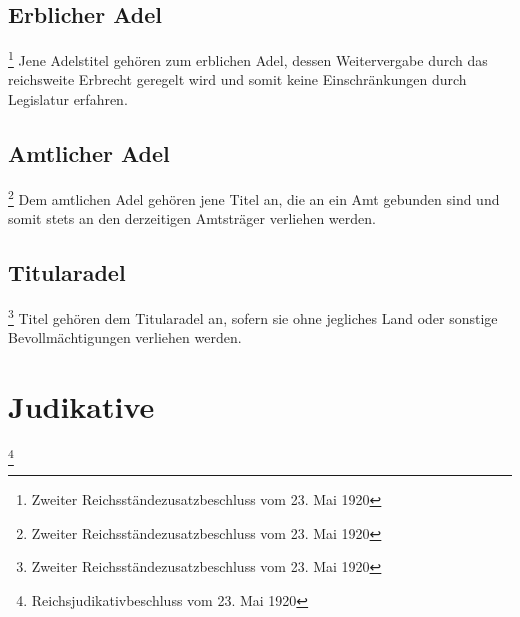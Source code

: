 \documentclass{article}
\begin{document}
\subsection{Erblicher Adel}\footnote{Zweiter Reichsständezusatzbeschluss vom 23. Mai 1920}
Jene Adelstitel gehören zum erblichen Adel, dessen Weitervergabe durch das reichsweite Erbrecht geregelt wird und somit keine Einschränkungen durch Legislatur erfahren.

\subsection{Amtlicher Adel}\footnote{Zweiter Reichsständezusatzbeschluss vom 23. Mai 1920}
Dem amtlichen Adel gehören jene Titel an, die an ein Amt gebunden sind und somit stets an den derzeitigen Amtsträger verliehen werden.

\subsection{Titularadel}\footnote{Zweiter Reichsständezusatzbeschluss vom 23. Mai 1920}
Titel gehören dem Titularadel an, sofern sie ohne jegliches Land oder sonstige Bevollmächtigungen verliehen werden.

\section{Judikative}\footnote{Reichsjudikativbeschluss vom 23. Mai 1920}
\end{document}
